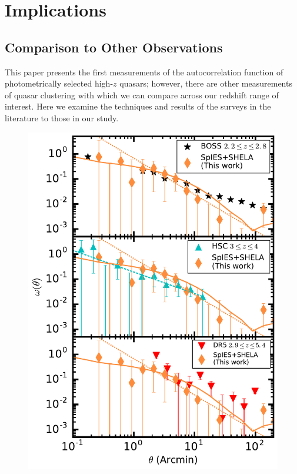 \documentclass[apj, numberedappendix]{emulateapj}
\begin{document}
\section{Implications}\label{sec:5}
\subsection{Comparison to Other Observations}\label{sec:comparisons}

This paper presents the first measurements of the autocorrelation function of photometrically selected high-$z$ quasars; however, there are other measurements of quasar clustering with which we can compare across our redshift range of interest. Here we examine the techniques and results of the surveys in the literature to those in our study. 

\begin{figure}[ht!]
\centering
\includegraphics[scale = 0.80]{./New_Plots/comparison_corrfunc.pdf}

\end{figure}
\end{document}
